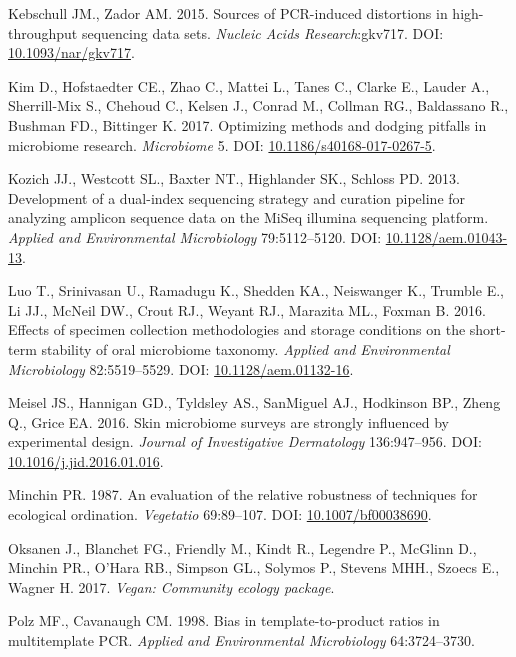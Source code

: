 \documentclass[11pt,]{article}
\begin{document}
\hypertarget{ref-Kebschull2015}{}
Kebschull JM., Zador AM. 2015. Sources of PCR-induced distortions in
high-throughput sequencing data sets. \emph{Nucleic Acids
Research}:gkv717. DOI:
\href{https://doi.org/10.1093/nar/gkv717}{10.1093/nar/gkv717}.

\hypertarget{ref-review_Kim_2017}{}
Kim D., Hofstaedter CE., Zhao C., Mattei L., Tanes C., Clarke E., Lauder
A., Sherrill-Mix S., Chehoud C., Kelsen J., Conrad M., Collman RG.,
Baldassano R., Bushman FD., Bittinger K. 2017. Optimizing methods and
dodging pitfalls in microbiome research. \emph{Microbiome} 5. DOI:
\href{https://doi.org/10.1186/s40168-017-0267-5}{10.1186/s40168-017-0267-5}.

\hypertarget{ref-protocol_Kozich_2013}{}
Kozich JJ., Westcott SL., Baxter NT., Highlander SK., Schloss PD. 2013.
Development of a dual-index sequencing strategy and curation pipeline
for analyzing amplicon sequence data on the MiSeq illumina sequencing
platform. \emph{Applied and Environmental Microbiology} 79:5112--5120.
DOI: \href{https://doi.org/10.1128/aem.01043-13}{10.1128/aem.01043-13}.

\hypertarget{ref-preservation_Luo_2016}{}
Luo T., Srinivasan U., Ramadugu K., Shedden KA., Neiswanger K., Trumble
E., Li JJ., McNeil DW., Crout RJ., Weyant RJ., Marazita ML., Foxman B.
2016. Effects of specimen collection methodologies and storage
conditions on the short-term stability of oral microbiome taxonomy.
\emph{Applied and Environmental Microbiology} 82:5519--5529. DOI:
\href{https://doi.org/10.1128/aem.01132-16}{10.1128/aem.01132-16}.

\hypertarget{ref-Meisel2016}{}
Meisel JS., Hannigan GD., Tyldsley AS., SanMiguel AJ., Hodkinson BP.,
Zheng Q., Grice EA. 2016. Skin microbiome surveys are strongly
influenced by experimental design. \emph{Journal of Investigative
Dermatology} 136:947--956. DOI:
\href{https://doi.org/10.1016/j.jid.2016.01.016}{10.1016/j.jid.2016.01.016}.

\hypertarget{ref-bc_index_Minchin1987}{}
Minchin PR. 1987. An evaluation of the relative robustness of techniques
for ecological ordination. \emph{Vegetatio} 69:89--107. DOI:
\href{https://doi.org/10.1007/bf00038690}{10.1007/bf00038690}.

\hypertarget{ref-vegan_citation}{}
Oksanen J., Blanchet FG., Friendly M., Kindt R., Legendre P., McGlinn
D., Minchin PR., O'Hara RB., Simpson GL., Solymos P., Stevens MHH.,
Szoecs E., Wagner H. 2017. \emph{Vegan: Community ecology package}.

\hypertarget{ref-polz_bias_1998}{}
Polz MF., Cavanaugh CM. 1998. Bias in template-to-product ratios in
multitemplate PCR. \emph{Applied and Environmental Microbiology}
64:3724--3730.
\end{document}
